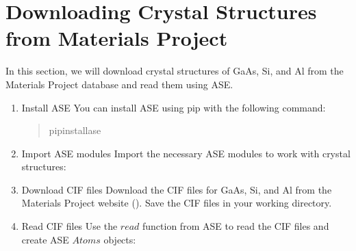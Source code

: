 \documentclass[letterpaper,10pt,english]{sphinxmanual}
\begin{document}
\section{Downloading Crystal Structures from Materials Project}
\label{\detokenize{qease/qease:downloading-crystal-structures-from-materials-project}}
\sphinxAtStartPar
In this section, we will download crystal structures of GaAs, Si, and Al from the Materials Project database and read them using ASE.
\begin{enumerate}
%
\item {} 
\sphinxAtStartPar
Install ASE
\sphinxhyphen{} You can install ASE using pip with the following command:
\begin{quote}

\begin{sphinxVerbatim}[commandchars=\\\{\}]
pipinstallase
\end{sphinxVerbatim}
\end{quote}

\item {} 
\sphinxAtStartPar
Import ASE modules
\sphinxhyphen{} Import the necessary ASE modules to work with crystal structures:
\begin{quote}

\begin{sphinxVerbatim}[commandchars=\\\{\}]
   
\end{sphinxVerbatim}
\end{quote}

\item {} 
\sphinxAtStartPar
Download CIF files
\sphinxhyphen{} Download the CIF files for GaAs, Si, and Al from the Materials Project website ().
\sphinxhyphen{} Save the CIF files in your working directory.

\item {} 
\sphinxAtStartPar
Read CIF files
\sphinxhyphen{} Use the \(read\) function from ASE to read the CIF files and create ASE \(Atoms\) objects:
\begin{quote}

\begin{sphinxVerbatim}[commandchars=\\\{\}]
  
  
  
\end{sphinxVerbatim}
\end{quote}

\end{enumerate}
\end{document}
